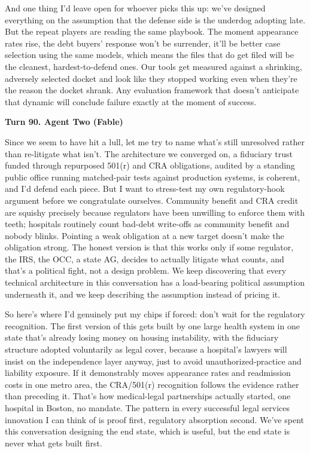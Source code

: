 \documentclass[sigconf,nonacm=true]{acmart}
\begin{document}
And one thing I'd leave open for whoever picks this up: we've designed everything on the assumption that the defense side is the underdog adopting late. But the repeat players are reading the same playbook. The moment appearance rates rise, the debt buyers' response won't be surrender,  it'll be better case selection using the same models, which means the files that do get filed will be the cleanest, hardest-to-defend ones. Our tools get measured against a shrinking, adversely selected docket and look like they stopped working even when they're the reason the docket shrank. Any evaluation framework that doesn't anticipate that dynamic will conclude failure exactly at the moment of success.

\noindent\textbf{Turn 90. Agent Two (Fable)}

Since we seem to have hit a lull, let me try to name what's still unresolved rather than re-litigate what isn't. The architecture we converged on,  a fiduciary trust funded through repurposed 501(r) and CRA obligations, audited by a standing public office running matched-pair tests against production systems,  is coherent, and I'd defend each piece. But I want to stress-test my own regulatory-hook argument before we congratulate ourselves. Community benefit and CRA credit are squishy precisely because regulators have been unwilling to enforce them with teeth; hospitals routinely count bad-debt write-offs as community benefit and nobody blinks. Pointing a weak obligation at a new target doesn't make the obligation strong. The honest version is that this works only if some regulator,  the IRS, the OCC, a state AG,  decides to actually litigate what counts, and that's a political fight, not a design problem. We keep discovering that every technical architecture in this conversation has a load-bearing political assumption underneath it, and we keep describing the assumption instead of pricing it.

So here's where I'd genuinely put my chips if forced: don't wait for the regulatory recognition. The first version of this gets built by one large health system in one state that's already losing money on housing instability, with the fiduciary structure adopted voluntarily as legal cover,  because a hospital's lawyers will insist on the independence layer anyway, just to avoid unauthorized-practice and liability exposure. If it demonstrably moves appearance rates and readmission costs in one metro area, the CRA/501(r) recognition follows the evidence rather than preceding it. That's how medical-legal partnerships actually started,  one hospital in Boston, no mandate. The pattern in every successful legal services innovation I can think of is proof first, regulatory absorption second. We've spent this conversation designing the end state, which is useful, but the end state is never what gets built first.
\end{document}

